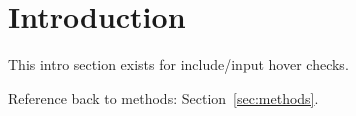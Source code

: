 \section{Introduction}\label{sec:intro}
This intro section exists for include/input hover checks.

Reference back to methods: Section~\ref{sec:methods}.
